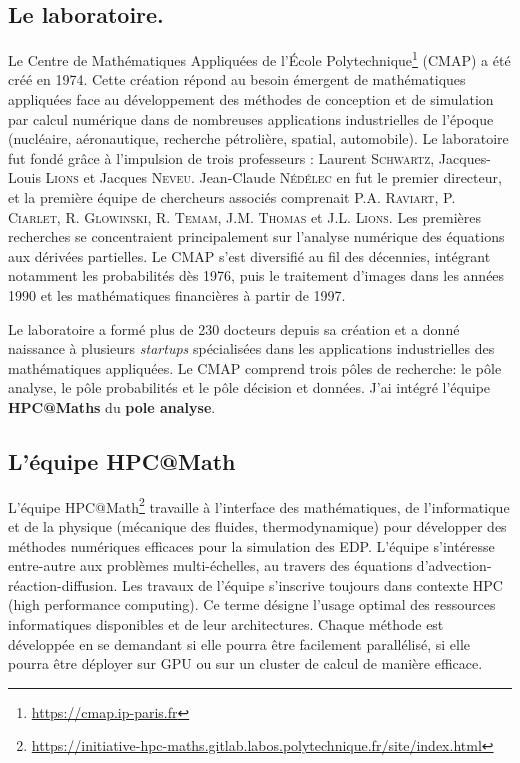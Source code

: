 \subsection{Le laboratoire.}
Le Centre de Mathématiques Appliquées de l'École Polytechnique\footnote{\href{https://cmap.ip-paris.fr}{https://cmap.ip-paris.fr}} (CMAP) a été créé en 1974.
Cette création répond au besoin émergent de mathématiques appliquées face au développement des méthodes de conception et de simulation par calcul numérique dans de nombreuses applications industrielles de l'époque (nucléaire, aéronautique, recherche pétrolière, spatial, automobile).
Le laboratoire fut fondé grâce à l'impulsion de trois professeurs : Laurent \textsc{Schwartz}, Jacques-Louis \textsc{Lions} et Jacques \textsc{Neveu}. Jean-Claude \textsc{Nédélec} en fut le premier directeur, et la première équipe de chercheurs associés comprenait P.A. \textsc{Raviart}, P. \textsc{Ciarlet}, R. \textsc{Glowinski}, R. \textsc{Temam}, J.M. \textsc{Thomas} et J.L. \textsc{Lions}. 
Les premières recherches se concentraient principalement sur l'analyse numérique des équations aux dérivées partielles.
Le CMAP s'est diversifié au fil des décennies, intégrant notamment les probabilités dès 1976, puis le traitement d'images dans les années 1990 et les mathématiques financières à partir de 1997. 

Le laboratoire a formé plus de 230 docteurs depuis sa création et a donné naissance à plusieurs \textit{startups} spécialisées dans les applications industrielles des mathématiques appliquées.
Le CMAP comprend trois pôles  de recherche: le pôle analyse, le pôle probabilités et le pôle décision et données.
J'ai intégré l'équipe \textbf{HPC@Maths} du \textbf{pole analyse}.
\subsection{L'équipe HPC@Math}
    L'équipe HPC@Math\footnote{\href{https://initiative-hpc-maths.gitlab.labos.polytechnique.fr/site/index.html}{https://initiative-hpc-maths.gitlab.labos.polytechnique.fr/site/index.html}} 
    travaille à l'interface des mathématiques, de l'informatique et de la physique (mécanique des fluides, thermodynamique) pour développer 
    des méthodes numériques efficaces pour la simulation des EDP. 
    L'équipe s'intéresse entre-autre aux problèmes multi-échelles, au travers des équations d'advection-réaction-diffusion.
    Les travaux de l'équipe s'inscrive toujours dans contexte HPC (high performance computing). 
    Ce terme désigne l'usage optimal des ressources informatiques disponibles et de leur architectures. 
    Chaque méthode est développée en se demandant si elle pourra être facilement parallélisé, si elle pourra être déployer sur GPU ou sur un cluster de calcul de manière efficace. 